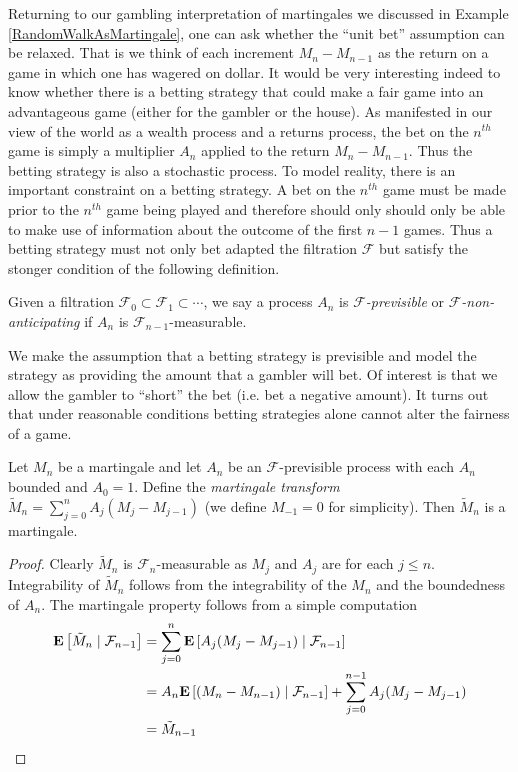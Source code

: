 Returning to our gambling interpretation of martingales we discussed in Example
\ref{RandomWalkAsMartingale}, one can 
ask whether the ``unit bet'' assumption can be relaxed.  That is we
think of each increment $M_n - M_{n-1}$ as the return on a game in
which one has wagered on dollar.  It
would be very interesting indeed to know whether there is a betting
strategy that could make a fair game into an advantageous game (either
for the gambler or the house).  As manifested in our view of the world
as a wealth process and a returns process, the bet on the $n^{th}$
game is simply a multiplier $A_n$ applied to the return $M_n -
M_{n-1}$.  Thus the betting strategy is also a stochastic process.  To
model reality, there is an important
constraint on a betting strategy.  A bet on the $n^{th}$ game must be
made prior to the $n^{th}$ game being played and therefore should only
should only be able to make use of information about the outcome of
the first $n-1$ games.  Thus a betting strategy must not only bet
adapted the filtration $\mathcal{F}$ but satisfy the stonger condition
of the following definition.
\begin{defn}Given a filtration $\mathcal{F}_0 \subset \mathcal{F}_1
  \subset \cdots$, we say a process $A_n$ is \emph{$\mathcal{F}$-previsible} or
  \emph{$\mathcal{F}$-non-anticipating} if $A_n$ is $\mathcal{F}_{n-1}$-measurable.
\end{defn}
We make the assumption that a betting strategy is previsible and model
the strategy as providing the amount that a gambler will bet.  Of
interest is that we allow the gambler to ``short'' the bet (i.e. bet a
negative amount).  It turns out that under reasonable conditions
betting strategies alone cannot alter the fairness of a game.
\begin{lem}Let $M_n$ be a martingale and let $A_n$ be an
  $\mathcal{F}$-previsible process with each $A_n$ bounded and $A_0 =
  1$.  
Define the \emph{martingale transform}
  $\tilde{M}_n = \sum_{j=0}^n A_j\left(M_j - M_{j-1}\right )$ (we
  define $M_{-1} = 0$ for simplicity).  Then $\tilde{M}_n$ is a martingale.
\end{lem}
\begin{proof}
Clearly $\tilde{M}_n$ is $\mathcal{F}_n$-measurable as $M_j$ and
$A_j$ are for each $j\leq n$.  Integrability
of $\tilde{M}_n$ follows from the integrability of the $M_n$ and the
boundedness of $A_n$.  The martingale property follows from a simple
computation
\begin{align*}
\cexpectationlong{\mathcal{F}_{n-1}}{\tilde{M}_n} &= \sum_{j=0}^n
\cexpectationlong{\mathcal{F}_{n-1}}{A_j(M_j - M_{j-1})} \\
&=A_n \cexpectationlong{\mathcal{F}_{n-1}}{(M_n - M_{n-1})}  +
\sum_{j=0}^{n-1} A_j(M_j - M_{j-1})\\
&= \tilde{M}_{n-1}
\end{align*}
\end{proof}


